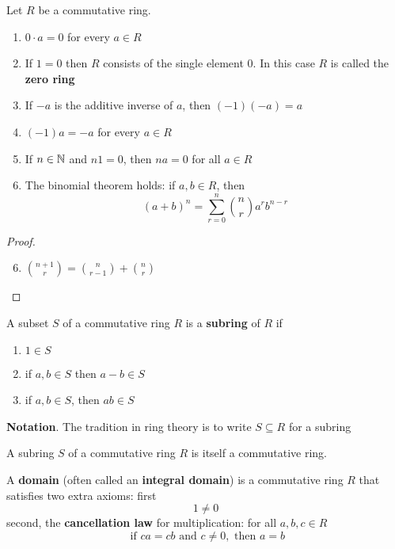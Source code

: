 \documentclass[11pt]{article}
\begin{document}
\begin{proposition}[]
Let \(R\) be a commutative ring.
\begin{enumerate}
\item \(0\cdot a=0\) for every \(a\in R\)
\item If \(1=0\) then \(R\) consists of the single element 0. In this case \(R\)
is called the \textbf{zero ring}
\item If \(-a\) is the additive inverse of \(a\), then \((-1)(-a)=a\)
\item \((-1)a=-a\) for every \(a\in R\)
\item If \(n\in\mathbb{N}\) and \(n1=0\), then \(na=0\) for all \(a\in R\)
\item The binomial theorem holds: if \(a,b\in R\), then 
\begin{equation*}
(a+b)^n=\displaystyle\sum_{r=0}^n\binom{n}{r}a^rb^{n-r}
\end{equation*}
\end{enumerate}
\end{proposition}

\begin{proof}
\begin{enumerate}
\setcounter{enumi}{5}
\item \(\binom{n+1}{r}=\binom{n}{r-1}+\binom{n}{r}\)
\end{enumerate}
\end{proof}

\begin{definition}[]
A subset \(S\) of a commutative ring \(R\) is a \textbf{subring} of \(R\) if
\begin{enumerate}
\item \(1\in S\)
\item if \(a,b\in S\) then \(a-b\in S\)
\item if \(a,b\in S\), then \(ab\in S\)
\end{enumerate}
\end{definition}

\textbf{Notation}. The tradition in ring theory is to write \(S\subseteq R\) for a
subring

\begin{proposition}[]
A subring \(S\) of a commutative ring \(R\) is itself a commutative ring.
\end{proposition}

\begin{definition}[]
A \textbf{domain} (often called an \textbf{integral domain}) is a commutative ring \(R\) that
satisfies two extra axioms: first
\begin{equation*}
1\neq 0
\end{equation*}
second, the \textbf{cancellation law} for multiplication: for all \(a,b,c\in R\)
\begin{equation*}
\text{ if } ca=cb\text{ and }c\neq 0,\text{ then }a=b
\end{equation*}
\end{definition}
\end{document}
